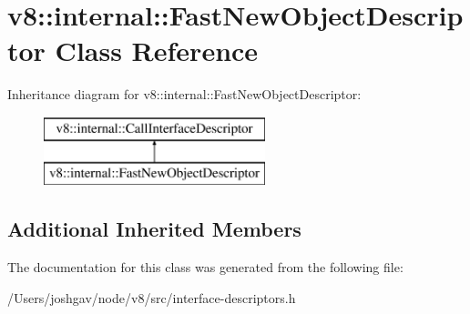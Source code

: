 \hypertarget{classv8_1_1internal_1_1_fast_new_object_descriptor}{}\section{v8\+:\+:internal\+:\+:Fast\+New\+Object\+Descriptor Class Reference}
\label{classv8_1_1internal_1_1_fast_new_object_descriptor}
Inheritance diagram for v8\+:\+:internal\+:\+:Fast\+New\+Object\+Descriptor\+:\begin{figure}[H]
\begin{center}
\leavevmode
\includegraphics[height=2.000000cm]{classv8_1_1internal_1_1_fast_new_object_descriptor}
\end{center}
\end{figure}
\subsection*{Additional Inherited Members}


The documentation for this class was generated from the following file\+:\begin{DoxyCompactItemize}
\item 
/\+Users/joshgav/node/v8/src/interface-\/descriptors.\+h\end{DoxyCompactItemize}
